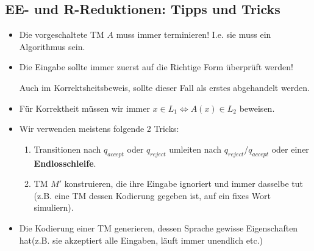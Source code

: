 \documentclass[a4paper, 11pt]{article}
\def\Lr{\mathcal{L}_\text{R}}
\begin{document}
                
                
                
                    \subsection{EE- und R-Reduktionen: Tipps und Tricks}
                        \begin{itemize}[label=-]
                            \item Die vorgeschaltete TM $A$ muss immer terminieren! I.e. sie muss ein Algorithmus sein.
                            
                            \item Die Eingabe sollte immer zuerst auf die Richtige Form überprüft werden!
                            
                            Auch im Korrektsheitsbeweis, sollte dieser Fall als erstes abgehandelt werden.
                            \item Für Korrektheit müssen wir immer $x \in L_1 \iff A(x) \in L_2$ beweisen.
                            
                            \item Wir verwenden meistens folgende 2 Tricks:
                            \begin{enumerate}[label=\roman*.]
                                \item Transitionen nach $q_{accept}$ oder $ q_{reject}$ umleiten nach $q_{reject}$/$q_{accept}$ oder einer \textbf{Endlosschleife}. 
                                \item TM $M'$ konstruieren, die ihre Eingabe ignoriert und immer dasselbe tut (z.B. eine TM dessen Kodierung gegeben ist, auf ein fixes Wort simuliern).
                            \end{enumerate}
                            
                            \item Die Kodierung einer TM generieren, dessen Sprache gewisse Eigenschaften hat(z.B. sie akzeptiert alle Eingaben, läuft immer unendlich etc.)
                        \end{itemize}
                
            
            
\end{document}
